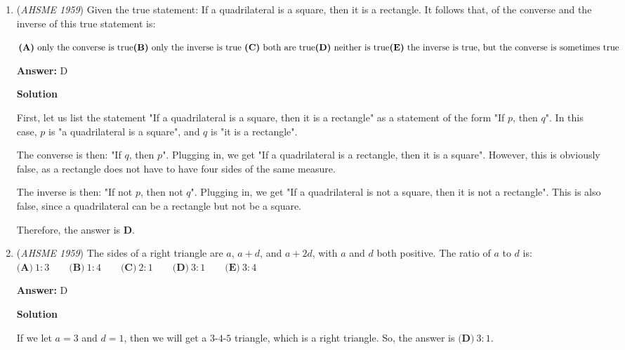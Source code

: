 \begin{enumerate}
	\item (\textit{AHSME 1959}) Given the true statement: If a quadrilateral is a square, then it is a rectangle. 
It follows that, of the converse and the inverse of this true statement is:


 $\textbf{(A)}\ \text{only the converse is true} \qquad \\ \textbf{(B)}\ \text{only the inverse is true }\qquad  \\ \textbf{(C)}\ \text{both are true} \qquad \\ \textbf{(D)}\ \text{neither is true} \qquad \\ \textbf{(E)}\ \text{the inverse is true, but the converse is sometimes true}$

 \textbf{Answer: }D



\textbf{Solution}

First, let us list the statement "If a quadrilateral is a square, then it is a rectangle" as a statement of the form "If $p$, then $q$". In this case, $p$ is "a quadrilateral is a square", and $q$ is "it is a rectangle".

 The converse is then: "If $q$, then $p$". Plugging in, we get "If a quadrilateral is a rectangle, then it is a square". However, this is obviously false, as a rectangle does not have to have four sides of the same measure.

 The inverse is then: "If not $p$, then not $q$". Plugging in, we get "If a quadrilateral is not a square, then it is not a rectangle". This is also false, since a quadrilateral can be a rectangle but not be a square. 

 Therefore, the answer is $\boxed{\textbf{D}}$.

 


 


	\item (\textit{AHSME 1959}) The sides of a right triangle are $a$, $a+d$, and $a+2d$, with $a$ and $d$ both positive. The ratio of $a$ to $d$ is:
$\textbf{(A)}\ 1:3 \qquad\textbf{(B)}\ 1:4 \qquad\textbf{(C)}\ 2:1\qquad\textbf{(D)}\ 3:1\qquad\textbf{(E)}\ 3:4$

 \textbf{Answer: }D



\textbf{Solution}

If we let $a=3$ and $d=1$, then we will get a $3$-$4$-$5$ triangle, which is a right triangle. So, the answer is $\boxed{\textbf{(D)} \ 3:1}$.


\end{enumerate}
